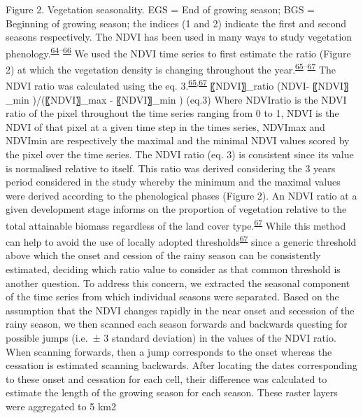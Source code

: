 \documentclass[12pt,oneside]{article}
\begin{document}
Figure 2. Vegetation seasonality. EGS = End of growing season; BGS =
Beginning of growing season; the indices (1 and 2) indicate the first
and second seasons respectively. The NDVI has been used in many ways to
study vegetation
phenology.\textsuperscript{\protect\hyperlink{ref-DeLeeuw_et_al_2012}{64}--\protect\hyperlink{ref-Yu_et_al_2012}{66}}
We used the NDVI time series to first estimate the ratio (Figure 2) at
which the vegetation density is changing throughout the
year.\textsuperscript{\protect\hyperlink{ref-Yu_et_al_2010}{65}--\protect\hyperlink{ref-White_et_al_1997}{67}}
The NDVI ratio was calculated using the eq.
3.\textsuperscript{\protect\hyperlink{ref-Yu_et_al_2010}{65},\protect\hyperlink{ref-White_et_al_1997}{67}}
〖NDVI〗\_ratio (NDVI- 〖NDVI〗\_min )/(〖NDVI〗\_max - 〖NDVI〗\_min )
(eq.3) Where NDVIratio is the NDVI ratio of the pixel throughout the
time series ranging from 0 to 1, NDVI is the NDVI of that pixel at a
given time step in the times series, NDVImax and NDVImin are
respectively the maximal and the minimal NDVI values scored by the pixel
over the time series. The NDVI ratio (eq. 3) is consistent since its
value is normalised relative to itself. This ratio was derived
considering the 3 years period considered in the study whereby the
minimum and the maximal values were derived according to the
phenological phases (Figure 2). An NDVI ratio at a given development
stage informs on the proportion of vegetation relative to the total
attainable biomass regardless of the land cover
type.\textsuperscript{\protect\hyperlink{ref-White_et_al_1997}{67}}
While this method can help to avoid the use of locally adopted
thresholds\textsuperscript{\protect\hyperlink{ref-White_et_al_1997}{67}}
since a generic threshold above which the onset and cession of the rainy
season can be consistently estimated, deciding which ratio value to
consider as that common threshold is another question. To address this
concern, we extracted the seasonal component of the time series from
which individual seasons were separated. Based on the assumption that
the NDVI changes rapidly in the near onset and secession of the rainy
season, we then scanned each season forwards and backwards questing for
possible jumps (i.e.~± 3 standard deviation) in the values of the NDVI
ratio. When scanning forwards, then a jump corresponds to the onset
whereas the cessation is estimated scanning backwards. After locating
the dates corresponding to these onset and cessation for each cell,
their difference was calculated to estimate the length of the growing
season for each season. These raster layers were aggregated to 5 km2
\end{document}
